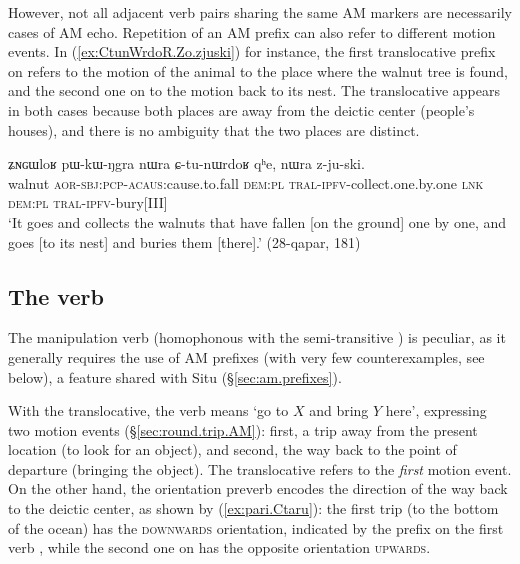 However, not all adjacent verb pairs sharing the same AM markers are necessarily cases of AM echo. Repetition of an AM prefix can also refer to different motion events. In (\ref{ex:CtunWrdoR.Zo.zjuski}) for instance, the first translocative prefix on  refers to the motion of the animal to the place where the walnut tree is found, and the second one on  to the motion back to its nest. The translocative appears in both cases because both places are away from the deictic center (people's houses), and there is no ambiguity that the two places are distinct.

\begin{exe}
\ex \label{ex:CtunWrdoR.Zo.zjuski}
\gll   ʑɴɢɯloʁ pɯ-kɯ-ŋgra nɯra ɕ-tu-nɯrdoʁ qʰe, nɯra z-ju-ski. \\
walnut \textsc{aor}-\textsc{sbj}:\textsc{pcp}-\textsc{acaus}:cause.to.fall \textsc{dem}:\textsc{pl}
\textsc{tral}-\textsc{ipfv}-collect.one.by.one \textsc{lnk} \textsc{dem}:\textsc{pl} \textsc{tral}-\textsc{ipfv}-bury[III] \\
\glt `It goes and collects the walnuts that have fallen [on the ground] one by one, and goes [to its nest] and buries them [there].' (28-qapar, 181)
\end{exe}

\subsection{The verb } \label{sec:ru.fetch}
The manipulation verb  (homophonous with the semi-transitive ) is peculiar, as it generally requires the use of AM prefixes (with very few counterexamples, see below), a feature shared with Situ (§\ref{sec:am.prefixes}). 

With the translocative, the verb  means `go to $X$ and bring $Y$ here',  expressing two motion events (§\ref{sec:round.trip.AM}): first, a trip away from the present location (to look for an object), and second, the way back to the point of departure (bringing the object). The translocative refers to the \textit{first} motion event.  On the other hand, the orientation preverb encodes the direction of the way back to the deictic center, as shown by (\ref{ex:pari.Ctaru}): the first trip (to the bottom of the ocean) has the \textsc{downwards} orientation, indicated by the prefix on the first verb , while the second one on  has the opposite orientation \textsc{upwards}.

